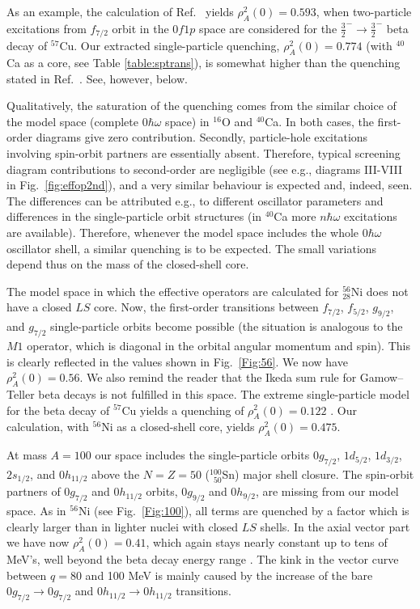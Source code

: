As an example,
the calculation of Ref.\ \cite{sem96} yields $\rho^2_A(0)=0.593$, when 
two-particle excitations from $f_{7/2}$ orbit in the $0f1p$ space are
considered for the $\frac{3}{2}^-\to\frac{3}{2}^-$ beta decay of $^{57}$Cu. 
Our extracted single-particle quenching, 
$\rho^2_A(0)=0.774$ (with $^{40}$Ca as a core, see Table \ref{table:sptrans}), 
is somewhat higher
than the quenching stated in Ref.\ \cite{sem96}. See, however, below. 

Qualitatively,
the saturation of the quenching comes from the similar choice of the
model space (complete $0\hbar\omega$ space) in $^{16}$O and $^{40}$Ca. 
In both cases, the first-order diagrams
give zero contribution. Secondly, particle-hole excitations
involving spin-orbit partners are essentially absent. Therefore, 
typical screening diagram contributions to second-order are negligible
(see e.g., diagrams III-VIII in Fig.\ \ref{fig:effop2nd}), 
and a very similar behaviour is expected and, indeed, seen.
The differences can be attributed e.g., to different oscillator
parameters and differences in the single-particle orbit structures (in 
$^{40}$Ca more $n\hbar\omega$ excitations are available).
Therefore, whenever the model space includes the whole $0\hbar\omega$
oscillator shell, a similar quenching is to be expected. The small
variations depend thus on the mass of the closed-shell core.

The model space in which the effective operators are calculated for
$^{56}_{28}$Ni does not have a
closed $LS$ core. Now, the first-order transitions between $f_{7/2}$,
$f_{5/2}$, $g_{9/2}$, and $g_{7/2}$ single-particle orbits become
possible (the situation is
analogous to the $M1$ operator, which is diagonal in the orbital angular
momentum and spin). This is clearly reflected in the values shown
in Fig.\ \ref{Fig:56}. We now have $\rho^2_A(0)=0.56$. We also remind
the reader that the Ikeda sum rule for Gamow--Teller beta decays
is not fulfilled in this space. The extreme single-particle model for
the beta decay of $^{57}$Cu yields a quenching of $\rho^2_A(0) = 0.122$
\cite{sem96}. Our calculation, with $^{56}$Ni as a closed-shell core,
yields $\rho^2_A(0) = 0.475$.

At mass $A=100$ our
space includes the single-particle orbits $0g_{7/2}$, $1d_{5/2}$, $1d_{3/2}$,
$2s_{1/2}$, and $0h_{11/2}$ above the $N=Z=50$ ($^{100}_{\phantom{1}50}$Sn)
major shell closure. The spin-orbit partners of $0g_{7/2}$ and 
$0h_{11/2}$ orbits, $0g_{9/2}$ and $0h_{9/2}$, are missing from our model
space. As in $^{56}$Ni (see
Fig.\ \ref{Fig:100}),  all terms are quenched by a factor which is clearly
larger than in lighter nuclei with closed $LS$ shells. In the axial
vector part we have now $\rho^2_A(0)=0.41$, which
again stays nearly constant up to tens of MeV's, well beyond the beta
decay energy range .
The kink in the vector curve between $q=80$ and 100 MeV is mainly caused by
the increase of the bare $0g_{7/2}\to 0g_{7/2}$ and $0h_{11/2}\to 0h_{11/2}$
transitions.

